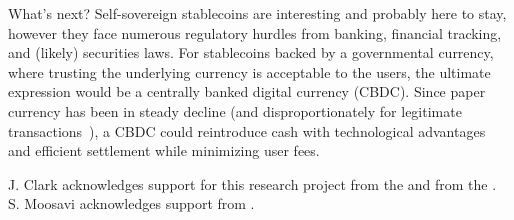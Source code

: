 What's next? Self-sovereign stablecoins are interesting and probably here to stay, however they face numerous regulatory hurdles from banking, financial tracking, and (likely) securities laws. For stablecoins backed by a governmental currency, where trusting the underlying currency is acceptable to the users, the ultimate expression would be a centrally banked digital currency (CBDC). Since paper currency has been in steady decline (and disproportionately for legitimate transactions~\cite{rogoff2017curse}), a CBDC could reintroduce cash with technological advantages and efficient settlement while minimizing user fees.

\begin{acks}

J. Clark acknowledges support for this research project from the  and from the . S. Moosavi acknowledges support from .


\end{acks}










